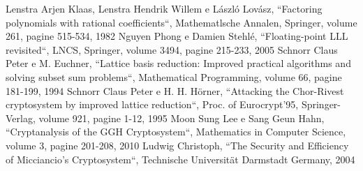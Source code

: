 \documentclass[a4paper,12pt]{report}
\theoremstyle{definition}
\begin{document}
\begin{thebibliography}{}
    Lenstra Arjen Klaas, Lenstra Hendrik Willem e László Lovász, 
    “Factoring polynomials with rational coefficients“, Mathematlsche Annalen, Springer, 
    volume 261, pagine 515-534, 1982
    Nguyen Phong e Damien Stehlé, “Floating-point LLL revisited“, LNCS, Springer, 
    volume 3494, pagine 215-233, 2005
    Schnorr Claus Peter e M. Euchner, 
    “Lattice basis reduction: Improved practical algorithms and solving subset sum problems“,
    Mathematical Programming, volume 66, pagine 181-199, 1994
    Schnorr Claus Peter e H. H. Hörner, 
    “Attacking the Chor-Rivest cryptosystem by improved lattice reduction“,
    Proc. of Eurocrypt'95, Springer-Verlag, volume 921, pagine 1-12, 1995
    Moon Sung Lee e Sang Geun Hahn, “Cryptanalysis of the GGH Cryptosystem“,
    Mathematics in Computer Science, volume 3, pagine 201-208, 2010
    Ludwig Christoph, “The Security and Efficiency of Micciancio’s
    Cryptosystem“, Technische Universität Darmstadt Germany, 2004

   
\end{thebibliography}
% 
\end{document}
